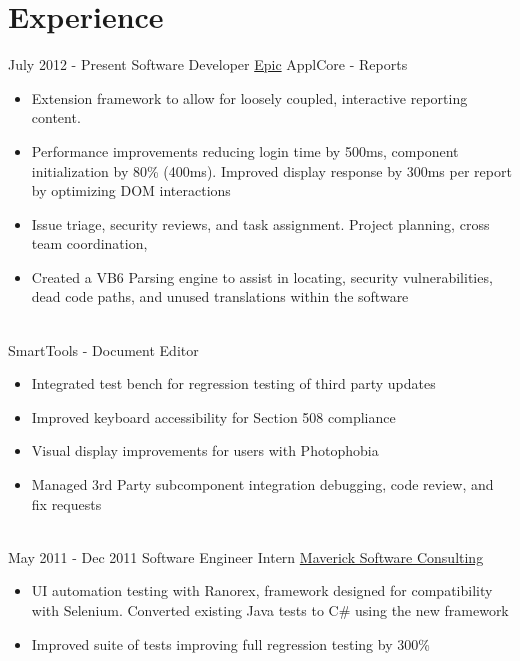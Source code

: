 \documentclass[letterpaper]{twentysecondcv} %
\begin{document}
\makeprofile %


\section{Experience}

\begin{twenty} %
\twentyitem
    	{July 2012 -}
		{Present}
        {Software Developer}
        {\href{https://www.epic.com/}{Epic}}
        {ApplCore - Reports}
        {\begin{itemize}
   		\item Extension framework to allow for loosely coupled, interactive reporting content.
   		
   		\item Performance improvements reducing login time by 500ms, component initialization by 80\% (400ms). Improved display response by 300ms per report by optimizing DOM interactions
   		
   		\item Issue triage, security reviews, and task assignment. Project planning, cross team coordination,
   		
   		\item Created a VB6 Parsing engine to assist in locating, security vulnerabilities, dead code paths, and unused translations within the software
        \end{itemize}}
\twentyitem
{}
{}
{ \\ \textnormal{SmartTools - Document Editor}}
{}
{}
{\begin{itemize}
\item Integrated test bench for regression testing of third party updates
\item Improved keyboard accessibility for Section 508 compliance
\item Visual display improvements for users with Photophobia
\item Managed 3rd Party subcomponent integration debugging, code review, and fix requests

\end{itemize}}
        \\
	\twentyitem
		{May 2011 -}
		{Dec 2011}
        {Software Engineer Intern}
        {\href{http://www.mavericksoftware.com/}{Maverick Software Consulting}}
        {}
        {
        {\begin{itemize}
        \item UI automation testing with Ranorex, framework designed for compatibility with Selenium. Converted existing Java tests to C\# using the new framework
        \item Improved suite of tests improving full regression testing by 300\%
        

\end{itemize}}}
\end{twenty}
\end{document}
